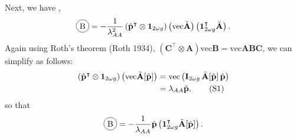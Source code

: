 \documentclass[11pt]{article}
\newcommand*\circled[1]{\tikz[baseline=(char.base)]{
            \node[shape=circle,draw,inner sep=2pt] (char) {#1};}}
\newcommand\numberthis{\addtocounter{equation}{1}\tag{\theequation}}
\def\mbf#1{\mathbf{#1}}
\begin{document}
Next, we have \circled{B},
\begin{equation}
	\circled{B} = - \frac{1}{\lambda_{AA}^2} \left( \hat{\mbf{p}}^{\intercal} \otimes \mbf{1}_{2 \omega g} \right) \left( \text{vec} \tilde{\mbf{A}} \right) \left( \mbf{1}^{\intercal}_{2 \omega g} \tilde{\mbf{A}} \right).
\end{equation}
Again using Roth's theorem (Roth 1934), $\left( \mbf{C}^{\intercal} \otimes \mbf{A} \right) \text{vec}\mbf{B} = \text{vec}\mbf{ABC}$, we can simplify as follows:
\begin{align*}
	\left( \hat{\mbf{p}}^{\intercal} \otimes \mbf{1}_{2 \omega g} \right) \left( \text{vec} \tilde{\mbf{A}}[\hat{\mbf{p}}] \right) &= \text{vec} \left( \mbf{I}_{2 \omega g}\, \tilde{\mbf{A}}[\hat{\mbf{p}}]\, \hat{\mbf{p}} \right) \\
					   &= \lambda_{AA} \hat{\mbf{p}}, \numberthis
\end{align*}
so that 
\begin{equation}
	\circled{B} = - \frac{1}{\lambda_{AA}} \hat{\mbf{p}} \left( \mbf{1}^{\intercal}_{2 \omega g} \tilde{\mbf{A}}[\hat{\mbf{p}}] \right).
\end{equation}
\end{document}
